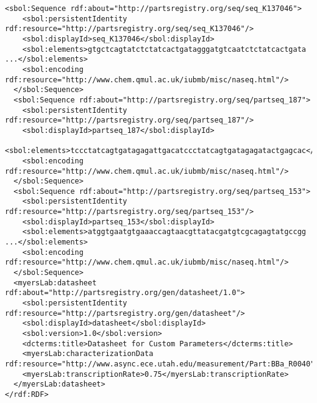 \begin{minipage}{0.95\textwidth} 
\begin{lstlisting}[breaklines=true]
  <sbol:Sequence rdf:about="http://partsregistry.org/seq/seq_K137046">
    <sbol:persistentIdentity rdf:resource="http://partsregistry.org/seq/seq_K137046"/>
    <sbol:displayId>seq_K137046</sbol:displayId>
    <sbol:elements>gtgctcagtatctctatcactgatagggatgtcaatctctatcactgata ...</sbol:elements>
    <sbol:encoding rdf:resource="http://www.chem.qmul.ac.uk/iubmb/misc/naseq.html"/>
  </sbol:Sequence>
  <sbol:Sequence rdf:about="http://partsregistry.org/seq/partseq_187">
    <sbol:persistentIdentity rdf:resource="http://partsregistry.org/seq/partseq_187"/>
    <sbol:displayId>partseq_187</sbol:displayId>
    <sbol:elements>tccctatcagtgatagagattgacatccctatcagtgatagagatactgagcac</sbol:elements>
    <sbol:encoding rdf:resource="http://www.chem.qmul.ac.uk/iubmb/misc/naseq.html"/>
  </sbol:Sequence>
  <sbol:Sequence rdf:about="http://partsregistry.org/seq/partseq_153">
    <sbol:persistentIdentity rdf:resource="http://partsregistry.org/seq/partseq_153"/>
    <sbol:displayId>partseq_153</sbol:displayId>
    <sbol:elements>atggtgaatgtgaaaccagtaacgttatacgatgtcgcagagtatgccgg ...</sbol:elements>
    <sbol:encoding rdf:resource="http://www.chem.qmul.ac.uk/iubmb/misc/naseq.html"/>
  </sbol:Sequence>
  <myersLab:datasheet rdf:about="http://partsregistry.org/gen/datasheet/1.0">
    <sbol:persistentIdentity rdf:resource="http://partsregistry.org/gen/datasheet"/>
    <sbol:displayId>datasheet</sbol:displayId>
    <sbol:version>1.0</sbol:version>
    <dcterms:title>Datasheet for Custom Parameters</dcterms:title>
    <myersLab:characterizationData rdf:resource="http://www.async.ece.utah.edu/measurement/Part:BBa_R0040"/>
    <myersLab:transcriptionRate>0.75</myersLab:transcriptionRate>
  </myersLab:datasheet>
</rdf:RDF>
\end{lstlisting}
\end{minipage}


